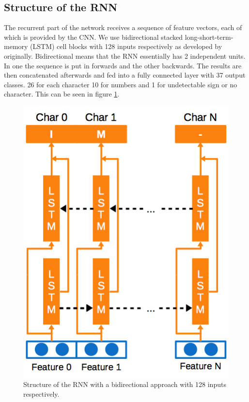 \documentclass{utue} %
\begin{document}
\subsection{Structure of the RNN}
The recurrent part of the network receives a sequence of feature vectors, each of which is provided by the CNN. We use bidirectional stacked long-short-term-memory (LSTM) cell blocks with 128 inputs respectively as developed by ~\cite{Hochreiter:1997:LSM:1246443.1246450} originally. Bidirectional means that the RNN essentially has 2 independent units. In one the sequence is put in forwards and the other backwards. The results are then concatenated afterwards and fed into a fully connected layer with 37 output classes. 26 for each character 10 for numbers and 1 for undetectable sign or no character. This can be seen in figure \ref{fig:rnn_structure}. \\
\begin{figure}[h!]
	\centering
	\includegraphics[width=.9\columnwidth]{graphics/model_rnn.png}
	\caption{\label{fig:rnn_structure} Structure of the RNN with a bidirectional approach with 128 inputs respectively.}
\end{figure}
\end{document}
